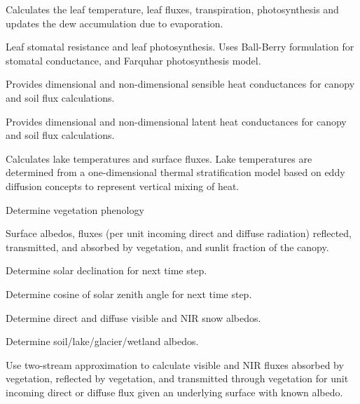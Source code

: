 \documentclass[]{article}
\begin{document}
Calculates the leaf temperature, leaf fluxes, transpiration,
photosynthesis and updates the dew accumulation due to
evaporation. \newline

Leaf stomatal resistance and leaf photosynthesis. Uses Ball-Berry
formulation for stomatal conductance, and Farquhar photosynthesis
model. \newline

Provides dimensional and non-dimensional sensible heat conductances
for canopy and soil flux calculations. \newline

Provides dimensional and non-dimensional latent heat conductances for
canopy and soil flux calculations. \newline

Calculates lake temperatures and surface fluxes. Lake temperatures
are determined from a one-dimensional thermal stratification model
based on eddy diffusion concepts to represent vertical mixing of
heat. \newline

Determine vegetation phenology \newline

Surface albedos, fluxes (per unit incoming direct and diffuse
radiation) reflected, transmitted, and absorbed by vegetation, and
sunlit fraction of the canopy. \newline

Determine solar declination for next time step. \newline

Determine cosine of solar zenith angle for next time step. \newline

Determine direct and diffuse visible and NIR snow albedos. \newline

Determine soil/lake/glacier/wetland albedos. \newline

Use two-stream approximation to calculate visible and NIR fluxes
absorbed by vegetation, reflected by vegetation, and transmitted
through vegetation for unit incoming direct or diffuse flux given an
underlying surface with known albedo. \newline
\end{document}
